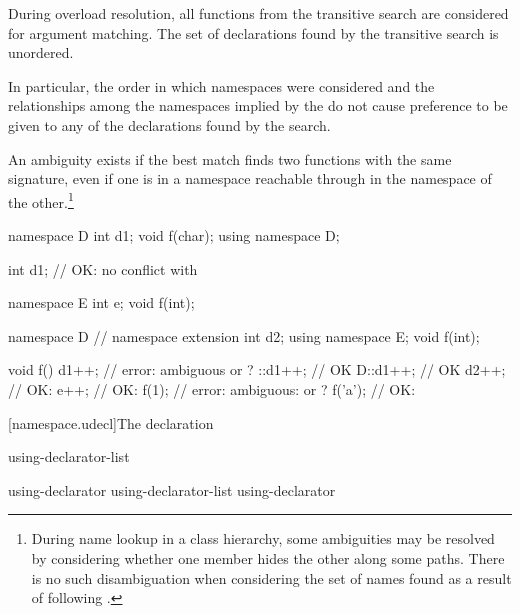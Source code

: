 \pnum
{}%
During overload resolution, all functions from the transitive search are
considered for argument matching. The set of declarations found by the
transitive search is unordered.
\begin{note}
In particular, the order in which namespaces were considered and the
relationships among the namespaces implied by the
 do not cause preference to be given to any
of the declarations found by the search.
\end{note}
An ambiguity exists if the best match finds two functions with the same
signature, even if one is in a namespace reachable through
 in the namespace of the other.\footnote{During
name lookup in a class hierarchy, some ambiguities may be
resolved by considering whether one member hides the other along some
paths. There is no such disambiguation when
considering the set of names found as a result of following
.}
\begin{example}
\begin{codeblock}
namespace D {
  int d1;
  void f(char);
}
using namespace D;

int d1;             // OK: no conflict with 

namespace E {
  int e;
  void f(int);
}

namespace D {       // namespace extension
  int d2;
  using namespace E;
  void f(int);
}

void f() {
  d1++;             // error: ambiguous  or ?
  ::d1++;           // OK
  D::d1++;          // OK
  d2++;             // OK: 
  e++;              // OK: 
  f(1);             // error: ambiguous:  or ?
  f('a');           // OK: 
}
\end{codeblock}
\end{example}
%

[namespace.udecl]{The  declaration}%

\begin{bnf}
\br
     using-declarator-list \terminal{;}
\end{bnf}

\begin{bnf}
\br
    using-declarator \br
    using-declarator-list \terminal{,} using-declarator 
\end{bnf}

